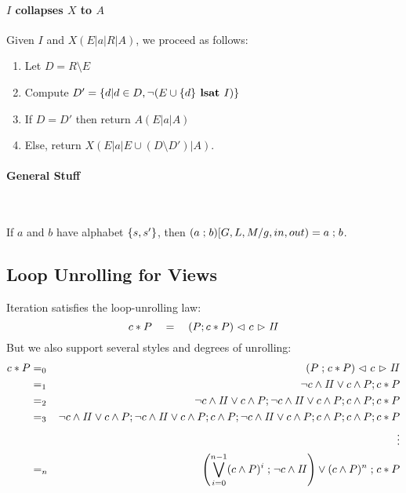 \paragraph{$I$ collapses $X$ to $A$}
Given $I$ and $X(E|a|R|A)$, we proceed as follows:
\begin{enumerate}
  \item Let $D = R \setminus E$
  \item Compute
    $D' =
       \{{  d | d \in D,
                    \lnot (E\cup\{{d}\} \textbf{ lsat } I)}\}
    $
  \item
    If $D = D'$ then return $A(E|a|A)$
  \item
    Else, return $X(E|a|E\cup(D \setminus D')|A)$.
\end{enumerate}

\paragraph{General Stuff}~

If $a$ and $b$ have alphabet $\{{s,s'}\}$,
then
$(a \mathrel{;} b)[G,L,M/g,in,out) = a\mathrel{;} b$.

\subsection{Loop Unrolling for Views}\label{hb:WWW-unroll}

Iteration  satisfies the loop-unrolling law:
\[
  c * P  \quad=\quad (P ; c * P ) \mathrel{\lhd ~ {c} ~ \rhd} \mathit{II}
\]
But we also support several styles and degrees of unrolling:
\begin{eqnarray*}
   c*P
   &=_0& (P\mathrel{;} c*P) \mathrel{\lhd ~ {c} ~ \rhd} \mathit{II}
\\ &=_1& \lnot c \land \mathit{II}
         \lor
         c \land P ; c * P
\\ &=_2& \lnot c \land \mathit{II}
         \lor
         c \land P ; \lnot c \land \mathit{II}
         \lor
         c \land P ; c \land P ; c * P
\\ &=_3& \lnot c \land \mathit{II}
         \lor
         c \land P ; \lnot c \land \mathit{II}
         \lor
         c \land P ; c \land P ; \lnot c \land \mathit{II}
         \lor
         c \land P ; c \land P ; c \land P ; c *P
\\ && \vdots
\\ &=_n& \left(
           \bigvee_{i=0}^{n-1}  (c \land P)^i \mathrel{;} \lnot c \land \mathit{II}
         \right)
         \lor
         (c \land P)^n \mathrel{;} c *P
\end{eqnarray*}


